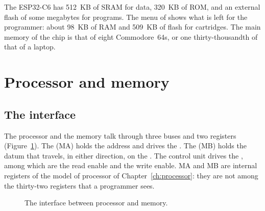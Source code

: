\begin{prgmachine}
The ESP32-C6 has 512~KB of SRAM for data, 320~KB of ROM, and an external
flash of some megabytes for programs. The menu of \prg shows what is left
for the programmer: about 98~KB of RAM and 509~KB of flash for cartridges.
The main memory of the chip is that of eight Commodore~64s, or one
thirty-thousandth of that of a laptop.
\end{prgmachine}

\section{Processor and memory}

\subsection{The interface}

The processor and the memory talk through three buses and two registers
(Figure~\ref{fig:mem:iface}). The  (MA) holds
the address and drives the . The  (MB) holds the datum that travels, in either direction, on the
. The control unit drives the , among
which are the read enable and the write enable. MA and MB are internal
registers of the model of processor of Chapter~\ref{ch:processor}: they are
not among the thirty-two registers that a \riscv programmer sees.

\begin{figure}[htb]
\centering
{}
\caption{The interface between processor and memory.}
\label{fig:mem:iface}
\end{figure}


